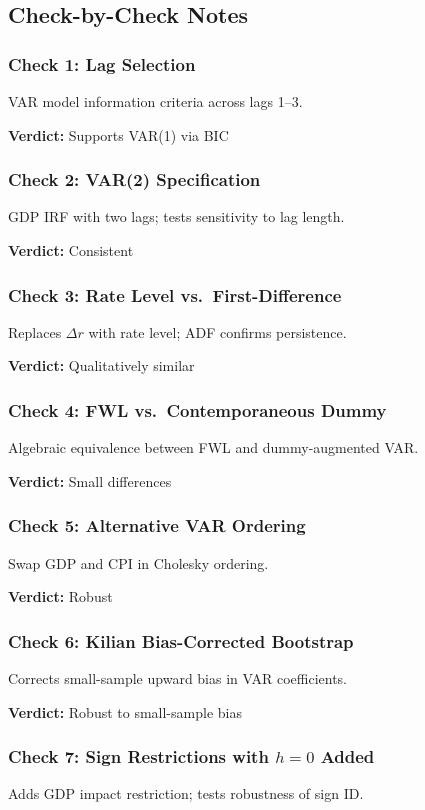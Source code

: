 \subsection{Check-by-Check Notes}
\subsubsection{Check 1: Lag Selection}
VAR model information criteria across lags 1--3.

\textbf{Verdict:} Supports VAR(1) via BIC


\subsubsection{Check 2: VAR(2) Specification}
GDP IRF with two lags; tests sensitivity to lag length.

\textbf{Verdict:} Consistent


\subsubsection{Check 3: Rate Level vs.\ First-Difference}
Replaces $\Delta r$ with rate level; ADF confirms persistence.

\textbf{Verdict:} Qualitatively similar


\subsubsection{Check 4: FWL vs.\ Contemporaneous Dummy}
Algebraic equivalence between FWL and dummy-augmented VAR.

\textbf{Verdict:} Small differences


\subsubsection{Check 5: Alternative VAR Ordering}
Swap GDP and CPI in Cholesky ordering.

\textbf{Verdict:} Robust


\subsubsection{Check 6: Kilian Bias-Corrected Bootstrap}
Corrects small-sample upward bias in VAR coefficients.

\textbf{Verdict:} Robust to small-sample bias


\subsubsection{Check 7: Sign Restrictions with $h=0$ Added}
Adds GDP impact restriction; tests robustness of sign ID.

